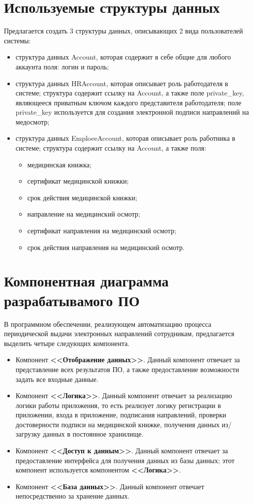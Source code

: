 \documentclass[12pt]{report}
\begin{document}
\section{Используемые структуры данных}
Предлагается создать 3 структуры данных, описывающих 2 вида пользователей системы:
\begin{itemize}
    \item структура данных Account, которая содержит в себе общие для любого аккаунта поля: логин и пароль;
    \item структура данных HRAccount, которая описывает роль работодателя в системе; структура содержит ссылку на Account, а также поле private\_key, являющееся приватным ключом каждого представителя работодателя; поле private\_key используется для создания электронной подписи направлений на медосмотр;
    \item структура данных EmploeeAccount, которая описывает роль работника в системе; структура содержит ссылку на Account, а также поля: 
    \begin{itemize}
        \item медицинская книжка;
        \item сертификат медицинской книжки;
        \item срок действия медицинской книжки;
        \item направление на медицинский осмотр;
        \item сертификат направления на медицинский осмотр;
        \item срок действия направления на медицинский осмотр.
    \end{itemize}
\end{itemize}

\section{Компонентная диаграмма разрабатывамого ПО}

В программном обеспечении, реализующем автоматизацию процесса периодической выдачи электронных направлений сотрудникам, предлагается выделить четыре следующих компонента. 

\begin{itemize}  \renewcommand\labelitemi{---} 
    \item Компонент \textbf{<<Отображение данных>>}. Данный компонент отвечает за представление всех результатов ПО, а также предоставление возможности задать все входные данные. 
    \item Компонент \textbf{<<Логика>>}. Данный компонент отвечает за реализацию логики работы приложения, то есть реализует логику регистрации в приложении, входа в приложение, подписания направлений, проверки достоверности подписи на медицинской книжке, получения данных из/загрузку данных в постоянное хранилище.
    \item Компонент \textbf{<<Доступ к данным>>}. Данный компонент отвечает за предоставление интерфейса для получения данных из базы данных; этот компонент используется компонентом \textbf{<<Логика>>}.
    \item Компонент \textbf{<<База данных>>}. Данный компонент отвечает непосредственно за хранение данных.
\end{itemize}
\end{document}
